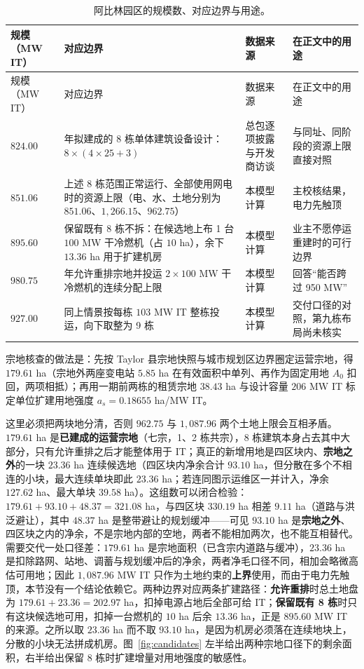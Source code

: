 {\footnotesize
\begin{longtable}{@{}>{\raggedright\arraybackslash}p{}>{\raggedright\arraybackslash}p{}>{\raggedright\arraybackslash}p{}>{\raggedright\arraybackslash}p{}@{}}
\caption{阿比林园区的规模数、对应边界与用途。}\label{tab:scales}\\
\toprule
规模（MW IT） & 对应边界 & 数据来源 & 在正文中的用途 \\
\midrule
\endfirsthead
\toprule
规模（MW IT） & 对应边界 & 数据来源 & 在正文中的用途 \\
\midrule
\endhead
\bottomrule
\endlastfoot
$824.00$ & 2026 年拟建成的 8 栋单体建筑设备设计：$8\times(4\times25+3)$ & 总包逐项披露与开发商访谈 & 与同址、同阶段的资源上限直接对照 \\
$851.06$ & 上述 8 栋范围正常运行、全部使用网电时的资源上限（电、水、土地分别为 $851.06$、$1{,}266.15$、$962.75$） & 本模型计算 & 主校核结果，电力先触顶 \\
$895.60$ & 保留既有 8 栋不拆：在候选地上布 1 台 $100$ MW 干冷燃机（占 $10$ ha），余下 $13.36$ ha 用于扩建机房 & 本模型计算 & 业主不愿停运重建时的可行边界 \\
$980.75$ & 2033 年允许重排宗地并投运 $2\times100$ MW 干冷燃机的连续分配上限 & 本模型计算 & 回答“能否跨过 950 MW” \\
$927.00$ & 同上情景按每栋 $103$ MW IT 整栋投运，向下取整为 9 栋 & 本模型计算 & 交付口径的对照，第九栋布局尚未核实 \\
\end{longtable}
}

宗地核查的做法是：先按 Taylor 县宗地快照与城市规划区边界圈定运营宗地，得 $179.61$ ha（宗地外两座变电站 $5.85$ ha 在有效面积中单列、再作为固定用地 $A_0$ 扣回，两项相抵）；再用一期前两栋的租赁宗地 $38.43$ ha 与设计容量 $206$ MW IT 标定单位扩建用地强度 $a_s=0.18655$ ha/MW IT。

这里必须把两块地分清，否则 $962.75$ 与 $1{,}087.96$ 两个土地上限会互相矛盾。$179.61$ ha 是\textbf{已建成的运营宗地}（七宗，1、2 栋共宗），8 栋建筑本身占去其中大部分，只有允许重排之后才能整体用于 IT；真正的新增用地是四区块内、\textbf{宗地之外}的一块 $23.36$ ha 连续候选地（四区块内净余合计 $93.10$ ha，但分散在多个不相连的小块，最大连续单块即此 $23.36$ ha；若连同图示运维区一并计入，净余 $127.62$ ha、最大单块 $39.58$ ha）。这组数可以闭合检验：$179.61+93.10+48.37=321.08$ ha，与四区块 $330.19$ ha 相差 $9.11$ ha（道路与洪泛避让），其中 $48.37$ ha 是整带避让的规划缓冲——可见 $93.10$ ha 是\textbf{宗地之外}、四区块之内的净余，不是宗地内部的空地，两者不能相加两次，也不能互相替代。需要交代一处口径差：$179.61$ ha 是宗地面积（已含宗内道路与缓冲），$23.36$ ha 是扣除路网、站地、调蓄与规划缓冲后的净余，两者净毛口径不同，相加会略微高估可用地；因此 $1{,}087.96$ MW IT 只作为土地约束的\textbf{上界}使用，而由于电力先触顶，本节没有一个结论依赖它。两种边界对应两条扩建路径：\textbf{允许重排}时总土地盘为 $179.61+23.36=202.97$ ha，扣掉电源占地后全部可给 IT；\textbf{保留既有 8 栋}时只有这块候选地可用，扣掉一台燃机的 $10$ ha 后余 $13.36$ ha，正是 $895.60$ MW IT 的来源。之所以取 $23.36$ ha 而不取 $93.10$ ha，是因为机房必须落在连续地块上，分散的小块无法拼成机房。图~\ref{fig:candidates} 左半给出两种宗地口径下的剩余面积，右半给出保留 8 栋时扩建增量对用地强度的敏感性。

